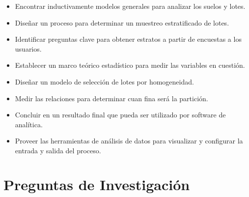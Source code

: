 \documentclass{report}
\begin{document}
\begin{itemize}
    \item Encontrar inductivamente modelos generales para analizar los suelos y lotes. 
    
    \item Diseñar un proceso para determinar un muestreo estratificado de lotes.
    
    \item Identificar preguntas clave para obtener estratos a partir de encuestas a los usuarios.
    
    \item Establecer un marco teórico estadístico para medir las variables en cuestión.
    
    \item Diseñar un modelo de selección de lotes por homogeneidad.
    
    \item Medir las relaciones para determinar cuan fina será la partición.
    
    \item Concluir en un resultado final que pueda ser utilizado por software de analítica.
    
    \item Proveer las herramientas de análisis de datos para visualizar y configurar la entrada y salida del proceso.
\end{itemize}


\section{Preguntas de Investigación}
\end{document}
